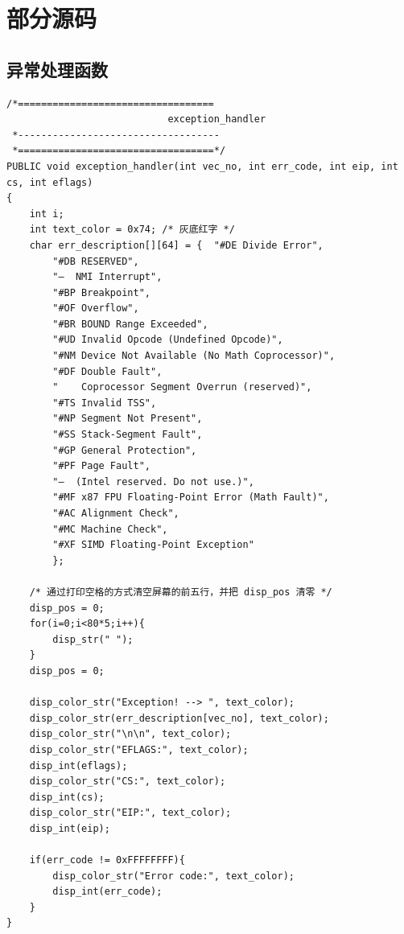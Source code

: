 \documentclass[UTF8,nofonts,cs4size]{ctexrep}
\begin{document}
\chapter{部分源码}
\section{异常处理函数}
\begin{lstlisting}
/*==================================
                            exception_handler
 *-----------------------------------
 *==================================*/
PUBLIC void exception_handler(int vec_no, int err_code, int eip, int cs, int eflags)
{
	int i;
	int text_color = 0x74; /* 灰底红字 */
	char err_description[][64] = {	"#DE Divide Error",
		"#DB RESERVED",
		"—  NMI Interrupt",
		"#BP Breakpoint",
		"#OF Overflow",
		"#BR BOUND Range Exceeded",
		"#UD Invalid Opcode (Undefined Opcode)",
		"#NM Device Not Available (No Math Coprocessor)",
		"#DF Double Fault",
		"    Coprocessor Segment Overrun (reserved)",
		"#TS Invalid TSS",
		"#NP Segment Not Present",
		"#SS Stack-Segment Fault",
		"#GP General Protection",
		"#PF Page Fault",
		"—  (Intel reserved. Do not use.)",
		"#MF x87 FPU Floating-Point Error (Math Fault)",
		"#AC Alignment Check",
		"#MC Machine Check",
		"#XF SIMD Floating-Point Exception"
		};

	/* 通过打印空格的方式清空屏幕的前五行，并把 disp_pos 清零 */
	disp_pos = 0;
	for(i=0;i<80*5;i++){
		disp_str(" ");
	}
	disp_pos = 0;

	disp_color_str("Exception! --> ", text_color);
	disp_color_str(err_description[vec_no], text_color);
	disp_color_str("\n\n", text_color);
	disp_color_str("EFLAGS:", text_color);
	disp_int(eflags);
	disp_color_str("CS:", text_color);
	disp_int(cs);
	disp_color_str("EIP:", text_color);
	disp_int(eip);

	if(err_code != 0xFFFFFFFF){
		disp_color_str("Error code:", text_color);
		disp_int(err_code);
	}
}
\end{lstlisting}
\end{document}

